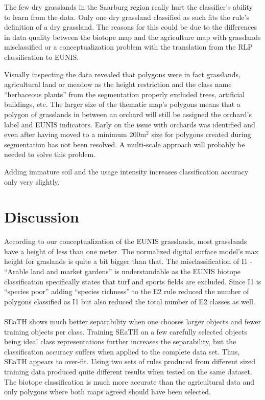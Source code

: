 \documentclass[authoryear, review,12pt,number]{elsarticle}
\begin{document}
The few dry grasslands in the Saarburg region really hurt the classifier's 
ability to learn from the data. Only one dry grassland classified as such fits 
the rule's definition of a dry grassland. The reasons for this could be due to 
the differences in data quality between the biotope map and the agriculture map 
with grasslands misclassified or a conceptualization problem with the 
translation from the RLP classification to EUNIS. 

Visually inspecting the data revealed that polygons were in fact grasslands, 
agricultural land or meadow as the height restriction and the class name 
``herbaceous plants'' from the segmentation properly excluded trees, artificial 
buildings, etc. The larger size of the thematic map's 
polygons means that a polygon of grasslands in between an orchard will still be 
assigned the orchard's label and EUNIS indicators. Early on the issue with
orchards was identified and even after having moved to a minimum 200m$^{2}$ size for
polygons created during segmentation has not been resolved. A multi-scale
approach will probably be needed to solve this problem.

Adding immature soil and the usage intensity increases classification accuracy 
only very slightly.

\section{Discussion}
According to our conceptualization of the EUNIS grasslands, most grasslands 
have a height of less than one meter. The normalized digital surface model's 
max height for graslands is quite a bit bigger than that.
The misclassification of I1 - ``Arable land and market gardens'' is 
understandable as the EUNIS biotope classification specifically states that 
turf and sports fields are excluded. Since I1 is ``species poor'' adding 
``species richness'' to the E2 rule reduced the number of polygons classified 
as I1 but also reduced the total number of E2 classes as well.\\
\\
SEaTH shows much better separability when one chooses
larger objects and fewer training objects per class. Training SEaTH on a few
carefully selected objects being ideal class representations further increases
the separability, but the classification accuracy suffers when applied to the
complete data set. Thus, SEaTH appears to over-fit. Using two sets of rules 
produced from different sized training data produced quite different results 
when tested on the same dataset. 
\\
The biotope classification is much more 
accurate than the agricultural data and only polygons where both maps agreed 
should have been selected.
\end{document}
